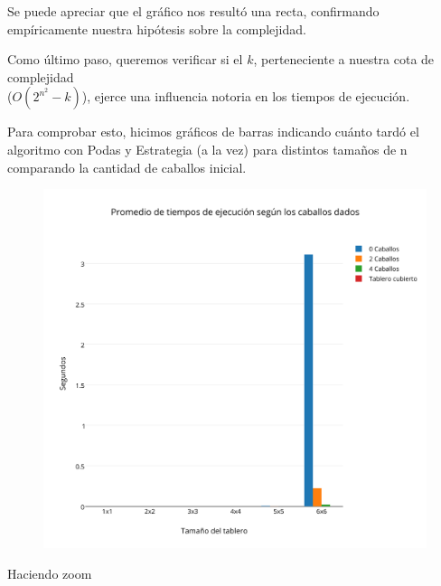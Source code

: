 Se puede apreciar que el gráfico nos resultó una recta, confirmando empíricamente nuestra hipótesis sobre la complejidad.

\newpage

Como último paso, queremos verificar si el $k$, perteneciente a nuestra cota de complejidad\\
($O(2^{n^2}-k)$), ejerce una influencia notoria en los tiempos de ejecución.

Para comprobar esto, hicimos gráficos de barras indicando cuánto tardó el algoritmo con Podas y Estrategia (a la vez) para distintos tamaños de n comparando la cantidad de caballos inicial.

\begin{figure}[h!]
   \begin{center}
\includegraphics[scale=0.3]{../src/ej3/Mediciones/Barras1.png} 
   \end{center}
 \end{figure}

\newpage
 
Haciendo zoom

